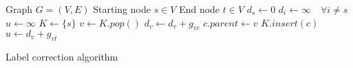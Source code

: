 \documentclass{article}
\begin{document}
\begin{preview}
    \begin{algorithm}[H]
        \begin{algorithmic}
        \Require
        \Statex Graph $G = (V, E)$
        \Statex Starting node $s \in V$
        \Statex End node $t \in V$
            \State $d_s \gets 0$
            \State $d_i \gets \infty \quad \forall i \neq s$
            \State $u \gets \infty$
            \State $K \gets \{s\}$ 
                \State $v \gets K.pop()$
                        \State $d_v \gets d_v + g_{vc}$
                        \State $c.parent \gets v$
                            \State $K.insert(c)$
                        \EndIf
                            \State $u \gets d_v + g_{vt}$
                        \EndIf
                    \EndIf
                \EndFor
            \EndWhile
        \EndProcedure
        \end{algorithmic}
    \caption{Label correction algorithm}
    \label{alg:label-correction-algorithm}
    \end{algorithm}
\end{preview}
\end{document}

